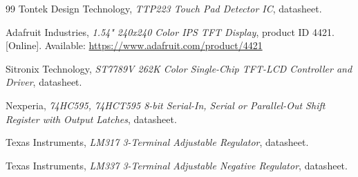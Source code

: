 \documentclass[11pt, letterpaper,titlepage]{article}
\begin{document}
\begin{thebibliography}{99}
Tontek Design Technology, \emph{TTP223 Touch Pad Detector IC}, datasheet.

Adafruit Industries, \emph{1.54" 240x240 Color IPS TFT Display}, product ID
4421. [Online]. Available: \url{https://www.adafruit.com/product/4421}

Sitronix Technology, \emph{ST7789V 262K Color Single-Chip TFT-LCD Controller
and Driver}, datasheet.

Nexperia, \emph{74HC595, 74HCT595 8-bit Serial-In, Serial or Parallel-Out Shift
Register with Output Latches}, datasheet.

Texas Instruments, \emph{LM317 3-Terminal Adjustable Regulator}, datasheet.

Texas Instruments, \emph{LM337 3-Terminal Adjustable Negative Regulator},
datasheet.

\end{thebibliography}
\endgroup




	
\end{document}
